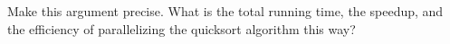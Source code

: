   Make this argument precise. What is the total running time, the
  speedup, and the efficiency of parallelizing the quicksort algorithm
  this way?
